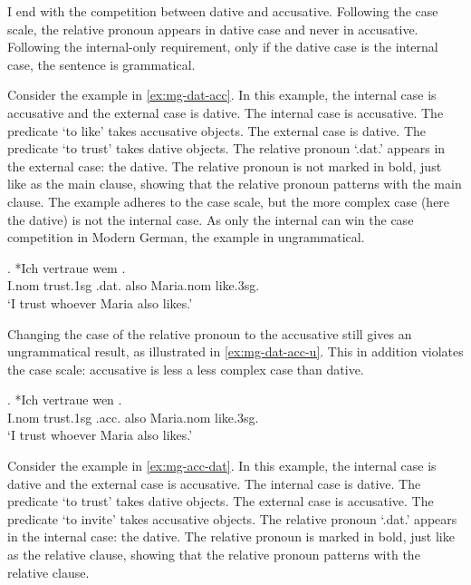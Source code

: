 I end with the competition between dative and accusative. Following the case scale, the relative pronoun appears in dative case and never in accusative. Following the internal-only requirement, only if the dative case is the internal case, the sentence is grammatical.

Consider the example in \ref{ex:mg-dat-acc}. In this example, the internal case is accusative and the external case is dative.
The internal case is accusative. The predicate  `to like' takes accusative objects.
The external case is dative. The predicate  `to trust' takes dative objects.
The relative pronoun  `.\ac{dat}.' appears in the external case: the dative. The relative pronoun is not marked in bold, just like as the main clause, showing that the relative pronoun patterns with the main clause.
The example adheres to the case scale, but the more complex case (here the dative) is not the internal case. As only the internal can win the case competition in Modern German, the example in ungrammatical.

\exg. *Ich vertraue wem   . \\
I.\ac{nom} trust.1\ac{sg}\scsub{[dat]} .\ac{dat}. also Maria.\ac{nom} like.3\ac{sg}\scsub{[acc]}.\\
`I trust whoever Maria also likes.' \label{ex:mg-dat-acc}

Changing the case of the relative pronoun to the accusative still gives an ungrammatical result, as illustrated in \ref{ex:mg-dat-acc-u}. This in addition violates the case scale: accusative is less a less complex case than dative.

\exg. *Ich vertraue wen   . \\
I.\ac{nom} trust.1\ac{sg}\scsub{[dat]} .\ac{acc}. also Maria.\ac{nom} like.3\ac{sg}\scsub{[acc]}.\\
`I trust whoever Maria also likes.' \label{ex:mg-dat-acc-u}

Consider the example in \ref{ex:mg-acc-dat}. In this example, the internal case is dative and the external case is accusative.
The internal case is dative. The predicate  `to trust' takes dative objects.
The external case is accusative. The predicate  `to invite' takes accusative objects.
The relative pronoun  `.\ac{dat}.' appears in the internal case: the dative. The relative pronoun is marked in bold, just like as the relative clause, showing that the relative pronoun patterns with the relative clause.

